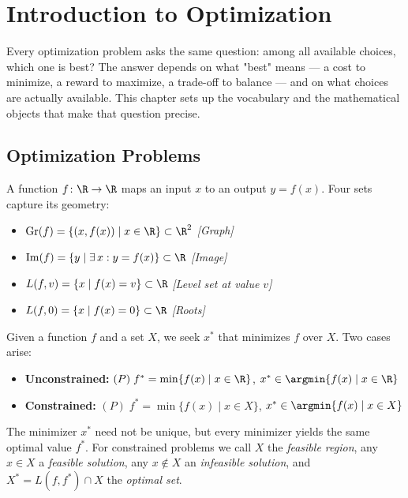 \section{Introduction to Optimization}

Every optimization problem asks the same question: among all available choices, which one is best?
The answer depends on what "best" means — a cost to minimize, a reward to maximize, a trade-off to balance — and on what choices are actually available.
This chapter sets up the vocabulary and the mathematical objects that make that question precise.


\subsection{Optimization Problems}

\begin{defn}
  A function $f \colon \R \to \R$ maps an input $x$ to an output $y = f(x)$.
  Four sets capture its geometry:
  \begin{itemize}
    \item $\mathrm{Gr}(f) = \{(x, f(x)) \mid x \in \R\} \subset \R^2$
      \hfill\textit{[Graph]}
    \item $\mathrm{Im}(f) = \{y \mid \exists\, x : y = f(x)\} \subset \R$
      \hfill\textit{[Image]}
    \item $L(f, v) = \{x \mid f(x) = v\} \subset \R$
      \hfill\textit{[Level set at value $v$]}
    \item $L(f, 0) = \{x \mid f(x) = 0\} \subset \R$
      \hfill\textit{[Roots]}
  \end{itemize}
\end{defn}

\begin{defn}\label{def:minimization}
  Given a function $f$ and a set $X$, we seek $x^*$ that minimizes $f$ over $X$.
  Two cases arise:
  \begin{itemize}
    \item \textbf{Unconstrained:}
      $(P)\; f^* = \min\{f(x) \mid x \in \R\}$,\;
      $x^* \in \argmin\{f(x) \mid x \in \R\}$
    \item \textbf{Constrained:}
      $(P)\; f^* = \min\{f(x) \mid x \in X\}$,\;
      $x^* \in \argmin\{f(x) \mid x \in X\}$
  \end{itemize}
  The minimizer $x^*$ need not be unique, but every minimizer yields the same optimal value $f^*$.
  For constrained problems we call $X$ the \textit{feasible region},
  any $x \in X$ a \textit{feasible solution},
  any $x \notin X$ an \textit{infeasible solution},
  and $X^* = L(f, f^*) \cap X$ the \textit{optimal set}.
\end{defn}

